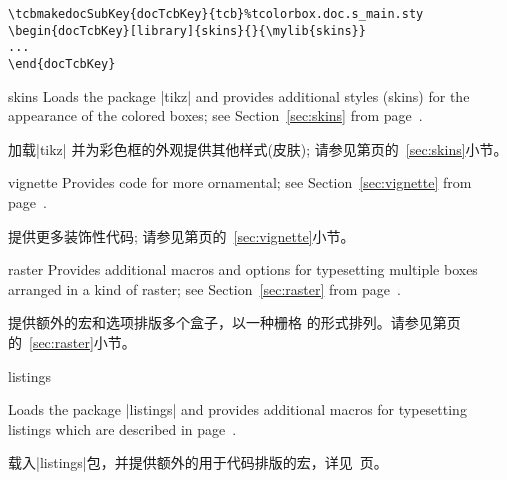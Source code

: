 \begin{verbatim}
\tcbmakedocSubKey{docTcbKey}{tcb}%tcolorbox.doc.s_main.sty
\begin{docTcbKey}[library]{skins}{}{\mylib{skins}}
...
\end{docTcbKey}
\end{verbatim}

\begin{docTcbKey}[library]{skins}{}{}
Loads the package |tikz| %
and provides additional styles (skins) for the appearance of the colored boxes; 
see  Section~\ref{sec:skins} from page~\pageref{sec:skins}.

加载|tikz|\makebox[0pt]{~}%
并为彩色框的外观提供其他样式(皮肤);
请参见第\pageref{sec:skins}页的~\ref{sec:skins}小节。
\end{docTcbKey}

\begin{docTcbKey}[library]{vignette}{}{}
Provides code for more ornamental; see
Section~\ref{sec:vignette} from page~\pageref{sec:vignette}.

提供更多装饰性代码; 请参见第\pageref{sec:vignette}页的~\ref{sec:vignette}小节。

\end{docTcbKey}

\begin{docTcbKey}[library]{raster}{}{}
Provides additional macros and options for typesetting 
multiple boxes arranged in a kind of raster;
see Section~\ref{sec:raster} from page~\pageref{sec:raster}.

提供额外的宏和选项排版多个盒子，以一种栅格\footnotemark%
的形式排列。请参见第\pageref{sec:raster}页的~\ref{sec:raster}小节。
\end{docTcbKey}
    
\begin{docTcbKey}[library]{listings}{}{}

Loads the package |listings| %
and provides additional macros for typesetting listings which are described in %
page~\pageref{sec:listings}.

载入|listings|包，并提供额外的用于代码排版的宏，详见~\pageref{sec:listings}页。%

\end{docTcbKey}

